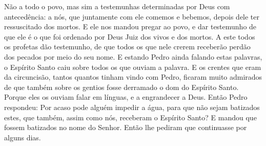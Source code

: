 {  Não a todo o povo, mas sim a testemunhas determinadas por Deus com antecedência: a nós, que juntamente com ele comemos e bebemos, depois dele ter ressuscitado dos mortos.
  E ele nos mandou pregar ao povo, e dar testemunho de que ele é o que foi ordenado por Deus
{} Juiz dos vivos e dos mortos.
  A este todos os profetas dão testemunho, de que todos os que nele crerem receberão perdão dos pecados por meio do seu nome.
  E estando Pedro ainda falando estas palavras, o Espírito Santo caiu sobre todos os que ouviam a palavra.
  E os crentes que eram da circuncisão, tantos quantos tinham vindo com Pedro, ficaram muito admirados de que também sobre os gentios fosse derramado o dom do Espírito Santo.
  Porque eles os ouviam falar em
{} línguas, e a engrandecer a Deus. Então Pedro respondeu:
  Por acaso pode alguém impedir a água, para que não sejam batizados estes, que também, assim como nós, receberam o Espírito Santo?
  E mandou que fossem batizados no nome do Senhor. Então lhe pediram que continuasse
{} por alguns dias.
\par }

